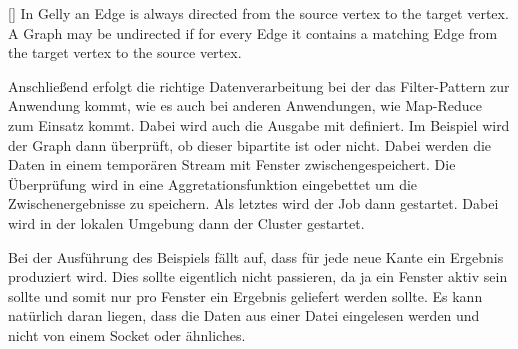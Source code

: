 [\cite{Foundation2018}]{
In Gelly an Edge is always directed from the source vertex to the target vertex.
A Graph may be undirected if for every Edge it contains a matching Edge from the
target vertex to the source vertex.}

Anschließend erfolgt die richtige Datenverarbeitung bei der das Filter-Pattern
zur Anwendung kommt, wie es auch bei anderen Anwendungen, wie Map-Reduce zum
Einsatz kommt. Dabei wird auch die Ausgabe mit definiert. Im Beispiel wird der
Graph dann überprüft, ob dieser bipartite ist oder nicht. Dabei werden die Daten
in einem temporären Stream mit Fenster zwischengespeichert. Die Überprüfung wird
in eine Aggretationsfunktion eingebettet um die Zwischenergebnisse zu speichern.
Als letztes wird der Job dann gestartet. Dabei wird in der lokalen Umgebung dann
der Cluster gestartet.

Bei der Ausführung des Beispiels fällt auf, dass für jede neue Kante ein
Ergebnis produziert wird. Dies sollte eigentlich nicht passieren, da ja ein
Fenster aktiv sein sollte und somit nur pro Fenster ein Ergebnis geliefert
werden sollte. Es kann natürlich daran liegen, dass die Daten aus einer Datei
eingelesen werden und nicht von einem Socket oder ähnliches.
